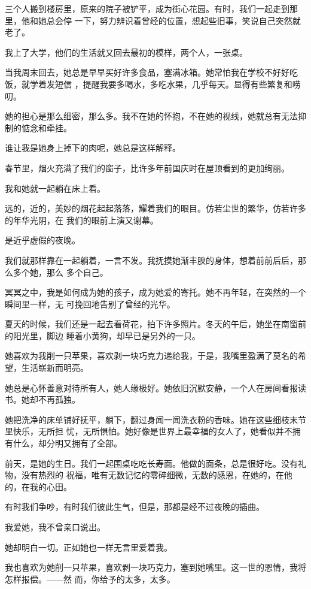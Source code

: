\documentclass[12pt,a4paper]{article}
\begin{document}
		三个人搬到楼房里，原来的院子被铲平，成为街心花园。有时，我们一起走到那里，他和她总会停
	一下，努力辨识着曾经的位置，想起些旧事，笑说自己突然就老了。

		我上了大学，他们的生活就又回去最初的模样，两个人，一张桌。

		当我周末回去，她总是早早买好许多食品，塞满冰箱。她常怕我在学校不好好吃饭，就学着发短信
	，提醒我要多喝水，多吃水果，几乎每天。显得有些繁复和唠叨。

		她的担心是那么细密，那么多。我不在她的怀抱，不在她的视线，她就总有无法抑制的惦念和牵挂。

		谁让我是她身上掉下的肉呢，她总是这样解释。

		春节里，烟火充满了我们的窗子，比许多年前国庆时在屋顶看到的更加绚丽。

		我和她就一起躺在床上看。

		远的，近的，美妙的烟花起起落落，耀着我们的眼目。仿若尘世的繁华，仿若许多的年华光阴，在
	我们的眼前上演又谢幕。

		是近乎虚假的夜晚。

		我们就那样靠在一起躺着，一言不发。我抚摸她渐丰腴的身体，想着前前后后，那么多个她，那么
	多个自己。

		冥冥之中，我是如何成为她的孩子，成为她爱的寄托。她不再年轻，在突然的一个瞬间里一样，无
	可挽回地告别了曾经的光华。

		夏天的时候，我们还是一起去看荷花，拍下许多照片。冬天的午后，她坐在南窗前的阳光里，脚边
	睡着小黄狗，却早已是另外的一只。


		她喜欢为我削一只苹果，喜欢剥一块巧克力递给我，于是，我嘴里盈满了莫名的希望，生活崭新而明亮。

		她总是心怀善意对待所有人，她人缘极好。她依旧沉默安静，一个人在房间看报读书。她却不再孤独。


		她把洗净的床单铺好抚平，躺下，翻过身闻一闻洗衣粉的香味。她在这些细枝末节里快乐，无所担
	忧，无所惧怕。她好像是世界上最幸福的女人了，她看似并不拥有什么，却分明又拥有了全部。

		前天，是她的生日。我们一起围桌吃吃长寿面。他做的面条，总是很好吃。没有礼物，没有热烈的
	祝福，唯有无数记忆的零碎细微，无数的感恩，在她的，在他的，在我的心田。


		有时我们争吵，有时我们彼此生气，但是，那都是经不过夜晚的插曲。

		我爱她，我不曾亲口说出。

		她却明白一切。正如她也一样无言里爱着我。


		我也喜欢为她削一只苹果，喜欢剥一块巧克力，塞到她嘴里。这一世的恩情，我将怎样报偿。——然
	而，你给予的太多，太多。
\end{document}
